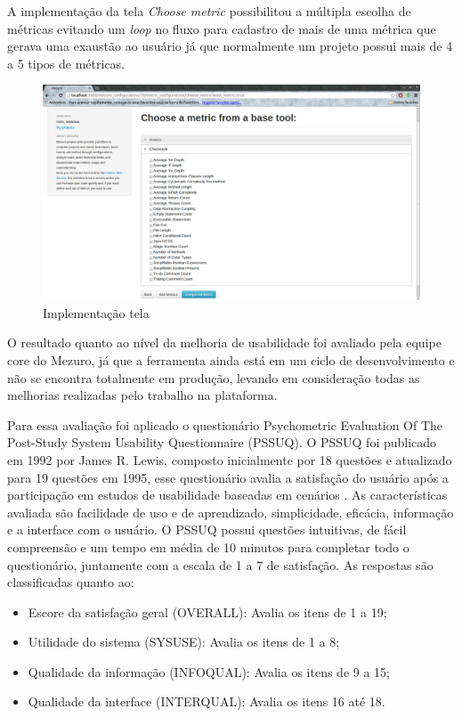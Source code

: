 A implementação da tela \textit{Choose metric} possibilitou a múltipla escolha de métricas evitando um \textit{loop} no fluxo para cadastro de mais de uma métrica que gerava uma exaustão ao usuário já que normalmente um projeto possui mais de 4 a 5 tipos de métricas.

\graphicspath{{figuras/}}
\begin{figure}[h]
\centering
\includegraphics[width=1.0\textwidth]{select_metrics}
\caption{Implementação tela}
\label{parallel-coordinate}
\end{figure}

O resultado quanto ao nível da melhoria de usabilidade foi avaliado pela equipe core do Mezuro, já que a ferramenta ainda está em um ciclo de desenvolvimento e não se encontra totalmente em produção, levando em consideração todas as melhorias realizadas pelo trabalho na plataforma.

Para essa avaliação foi aplicado o questionário Psychometric Evaluation Of The Post-Study System Usability Questionnaire (PSSUQ). O PSSUQ foi publicado em 1992 por James R. Lewis, composto inicialmente por 18 questões e atualizado para 19 questões em 1995, esse questionário avalia a satisfação do usuário após a participação em estudos de usabilidade baseadas em cenários \cite{lewis1992}. As características avaliada são facilidade de uso e de aprendizado, simplicidade, eficácia, informação e a interface com o usuário. O PSSUQ possui questões intuitivas, de fácil compreensão e um tempo em média de 10 minutos para completar todo o questionário, juntamente com a escala de 1 a 7 de satisfação. As respostas são classificadas quanto ao:
\begin{itemize}
\item Escore da satisfação geral (OVERALL): Avalia os itens de 1 a 19;
\item Utilidade do sistema (SYSUSE): Avalia os itens de 1 a 8;
\item Qualidade da informação (INFOQUAL): Avalia os itens de 9 a 15;
\item Qualidade da interface (INTERQUAL): Avalia os itens 16 até 18.
\end{itemize}

